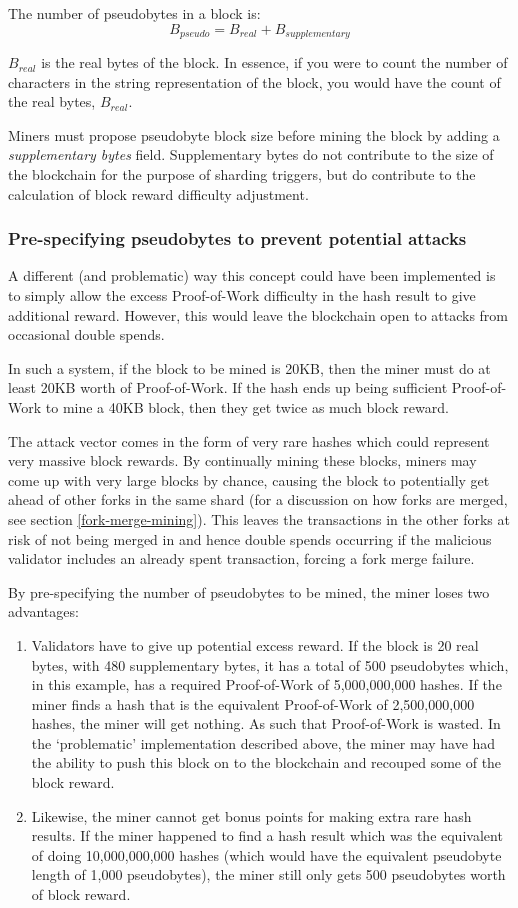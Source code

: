 \documentclass[a4paper,12pt]{article}
\begin{document}
The number of pseudobytes in a block is:
\[B_{pseudo} = B_{real} + B_{supplementary}\]

$B_{real}$ is the real bytes of the block. In essence, if you were to count the number of characters in the string representation of the block, you would have the count of the real bytes, $B_{real}$. 

Miners must propose pseudobyte block size before mining the block by adding a \textit{supplementary bytes} field. Supplementary bytes do not contribute to the size of the blockchain for the purpose of sharding triggers, but do contribute to the calculation of block reward difficulty adjustment.

\subsubsection{Pre-specifying pseudobytes to prevent potential attacks}
A different (and problematic) way this concept could have been implemented is to simply allow the excess Proof-of-Work difficulty in the hash result to give additional reward. However, this would leave the blockchain open to attacks from occasional double spends.

In such a system, if the block to be mined is 20KB, then the miner must do at least 20KB worth of Proof-of-Work. If the hash ends up being sufficient Proof-of-Work to mine a 40KB block, then they get twice as much block reward.

The attack vector comes in the form of very rare hashes which could represent very massive block rewards. By continually mining these blocks, miners may come up with very large blocks by chance, causing the block to potentially get ahead of other forks in the same shard (for a discussion on how forks are merged, see section \ref{fork-merge-mining}). This leaves the transactions in the other forks at risk of not being merged in and hence double spends occurring if the malicious validator includes an already spent transaction, forcing a fork merge failure.

By pre-specifying the number of pseudobytes to be mined, the miner loses two advantages:
\begin{enumerate}
  \item Validators have to give up potential excess reward. If the block is 20 real bytes, with 480 supplementary bytes, it has a total of 500 pseudobytes which, in this example, has a required Proof-of-Work of 5,000,000,000 hashes. If the miner finds a hash that is the equivalent Proof-of-Work of 2,500,000,000 hashes, the miner will get nothing. As such that Proof-of-Work is wasted. In the `problematic' implementation described above, the miner may have had the ability to push this block on to the blockchain and recouped some of the block reward. 
  \item Likewise, the miner cannot get bonus points for making extra rare hash results. If the miner happened to find a hash result which was the equivalent of doing 10,000,000,000 hashes (which would have the equivalent pseudobyte length of 1,000 pseudobytes), the miner still only gets 500 pseudobytes worth of block reward.
\end{enumerate}
\end{document}
